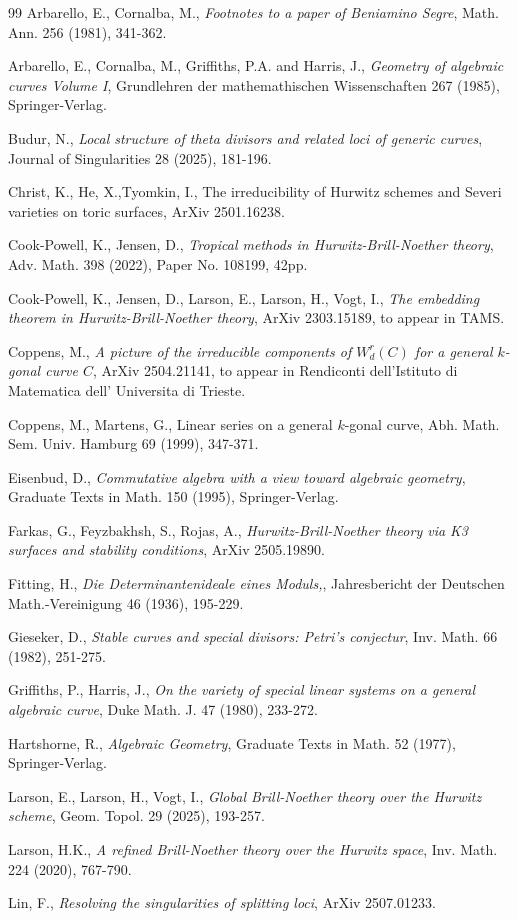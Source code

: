 \documentclass{article}
\theoremstyle{definition}
\theoremstyle{remark}
\begin{document}
\begin{thebibliography}{99}
Arbarello, E., Cornalba, M., \emph{Footnotes to a  paper of Beniamino Segre}, Math. Ann. 256 (1981), 341-362.

Arbarello, E., Cornalba, M., Griffiths, P.A. and Harris, J., \emph{Geometry of algebraic curves Volume I}, Grundlehren der mathemathischen Wissenschaften 267 (1985), Springer-Verlag.

Budur, N., \emph{Local structure of theta divisors and related loci of generic curves}, Journal of Singularities 28 (2025), 181-196.

Christ, K., He, X.,Tyomkin, I., The irreducibility of Hurwitz schemes and Severi varieties on toric surfaces, ArXiv 2501.16238.

Cook-Powell, K., Jensen, D., \emph{Tropical methods in Hurwitz-Brill-Noether theory}, Adv. Math. 398 (2022), Paper No. 108199, 42pp.

Cook-Powell, K., Jensen, D., Larson, E., Larson, H., Vogt, I., \emph{The embedding theorem in Hurwitz-Brill-Noether theory}, ArXiv 2303.15189, to appear in TAMS.

Coppens, M., \emph{A picture of the irreducible components of $ W^r_d(C)$ for a general $k$-gonal curve $C$}, ArXiv 2504.21141, to appear in Rendiconti dell'Istituto di Matematica dell' Universita di Trieste.

Coppens, M., Martens, G., Linear series on a general $k$-gonal curve, Abh. Math. Sem. Univ. Hamburg 69 (1999), 347-371.

Eisenbud, D., \emph{Commutative algebra with a view toward algebraic geometry}, Graduate Texts in Math. 150 (1995), Springer-Verlag.

Farkas, G., Feyzbakhsh, S., Rojas, A., \emph{Hurwitz-Brill-Noether theory via K3 surfaces and stability conditions}, ArXiv 2505.19890.

Fitting, H., \emph{Die Determinantenideale eines Moduls,}, Jahresbericht der Deutschen Math.-Vereinigung 46 (1936), 195-229.

Gieseker, D., \emph{Stable curves and special divisors: Petri's conjectur}, Inv. Math. 66 (1982), 251-275.

Griffiths, P., Harris, J., \emph{On the variety of special linear systems on a general algebraic curve}, Duke Math. J. 47 (1980), 233-272.

Hartshorne, R., \emph{Algebraic Geometry}, Graduate Texts in Math. 52 (1977), Springer-Verlag.

Larson, E., Larson, H., Vogt, I., \emph{Global Brill-Noether theory over the Hurwitz scheme}, Geom. Topol. 29 (2025), 193-257.

Larson, H.K., \emph{A refined Brill-Noether theory over the Hurwitz space}, Inv. Math. 224 (2020), 767-790.

Lin, F., \emph{Resolving the singularities of splitting loci}, ArXiv 2507.01233.

\end{thebibliography}
\end{document}
